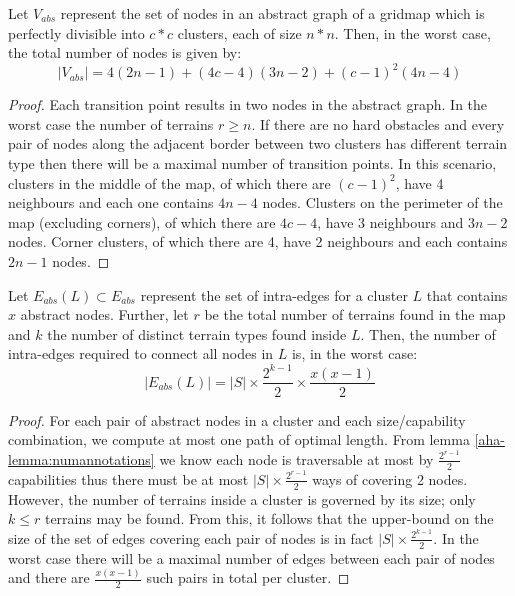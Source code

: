 \begin{lemma}
\label{aha-lemma:maxnodes}
Let $V_{abs}$ represent the set of nodes in an abstract graph of a gridmap which is perfectly divisible into $c*c$ clusters, each of size $n*n$. Then, in the worst case, the total number of nodes is given by:
$$|V_{abs}| = 4(2n-1) + (4c - 4)(3n-2) + (c-1)^2(4n-4)$$
\end{lemma}

\begin{proof}
Each transition point results in two nodes in the abstract graph. 
In the worst case the number of terrains $r \geq n$. 
If there are no hard obstacles and every pair of nodes along the adjacent border between two clusters has different terrain type then there will be a maximal number of transition points. 
In this scenario, clusters in the middle of the map, of which there are $(c-1)^2$, have 4 neighbours and each one contains $4n-4$ nodes. 
Clusters on the perimeter of the map (excluding corners), of which there are $4c-4$, have 3 neighbours and $3n-2$ nodes. 
Corner clusters, of which there are 4, have 2 neighbours and each contains $2n-1$ nodes.
\end{proof}

\begin{lemma}
\label{aha-lemma:maxedgesincluster}
Let $E_{abs}(L) \subset E_{abs}$ represent the set of intra-edges for a cluster $L$ that contains $x$ abstract nodes. Further, let $r$ be the total number of terrains found in the map and $k$ the number of distinct terrain types found inside $L$. Then, the number of intra-edges required to connect all nodes in $L$ is, in the worst case:
 $$|E_{abs}(L)| = |S|\times \frac{2^{k-1}}{2} \times \frac{x(x-1)}{2}$$
 \end{lemma}

\begin{proof}
For each pair of abstract nodes in a cluster and each size/capability combination, we compute at most one path of optimal length. 
From lemma \ref{aha-lemma:numannotations} we know each node is traversable at most by $\frac{2^{r-1}}{2}$ capabilities thus there must be at most $|S|\times \frac{2^{r-1}}{2}$ ways of covering 2 nodes. 
However, the number of terrains inside a cluster is governed by its size; only $k \leq r$ terrains may be found. 
From this, it follows that the upper-bound on the size of the set of edges covering each pair of nodes is in fact $|S| \times \frac{2^{k-1}}{2}$. 
In the worst case there will be a maximal number of edges between each pair of nodes and there are $\frac{x(x-1)}{2}$ such pairs in total per cluster. 
\end{proof}

